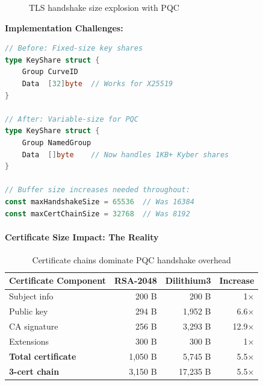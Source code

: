 \documentclass[11pt,a4paper]{article}
\begin{document}
\begin{figure}[h]
\centering
{}
\caption{TLS handshake size explosion with PQC}
\end{figure}

\textbf{Implementation Challenges:}

\begin{lstlisting}[language=Go, caption=TLS Library Modifications]
// Before: Fixed-size key shares
type KeyShare struct {
    Group CurveID
    Data  [32]byte  // Works for X25519
}

// After: Variable-size for PQC
type KeyShare struct {
    Group NamedGroup
    Data  []byte    // Now handles 1KB+ Kyber shares
}

// Buffer size increases needed throughout:
const maxHandshakeSize = 65536  // Was 16384
const maxCertChainSize = 32768  // Was 8192
\end{lstlisting}

\paragraph{Certificate Size Impact: The Reality}

\begin{table}[h]
\centering
\begin{tabular}{|l|r|r|r|}
\hline
\textbf{Certificate Component} & \textbf{RSA-2048} & \textbf{Dilithium3} & \textbf{Increase} \\
\hline
Subject info & 200 B & 200 B & 1× \\
Public key & 294 B & 1,952 B & 6.6× \\
CA signature & 256 B & 3,293 B & 12.9× \\
Extensions & 300 B & 300 B & 1× \\
\hline
\textbf{Total certificate} & 1,050 B & 5,745 B & 5.5× \\
\textbf{3-cert chain} & 3,150 B & 17,235 B & 5.5× \\
\hline
\end{tabular}
\caption{Certificate chains dominate PQC handshake overhead}
\end{table}
\end{document}
